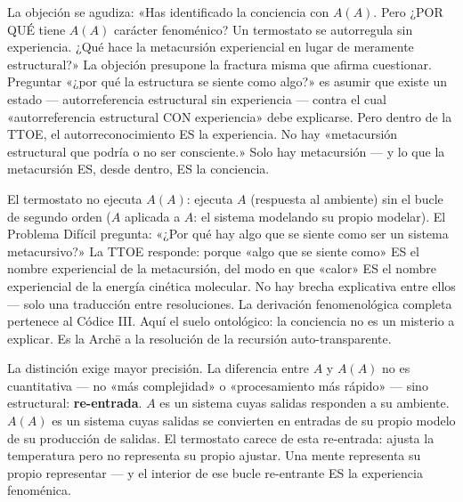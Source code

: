 \documentclass[10pt, openany, oneside]{book}
\begin{document}
La objeción se agudiza: «Has identificado la conciencia con $A(A)$. Pero ¿POR QUÉ tiene $A(A)$ carácter fenoménico? Un termostato se autorregula sin experiencia. ¿Qué hace la metacursión experiencial en lugar de meramente estructural?» La objeción presupone la fractura misma que afirma cuestionar. Preguntar «¿por qué la estructura se siente como algo?» es asumir que existe un estado --- autorreferencia estructural sin experiencia --- contra el cual «autorreferencia estructural CON experiencia» debe explicarse. Pero dentro de la TTOE, el autorreconocimiento ES la experiencia. No hay «metacursión estructural que podría o no ser consciente.» Solo hay metacursión --- y lo que la metacursión ES, desde dentro, ES la conciencia.

El termostato no ejecuta $A(A)$: ejecuta $A$ (respuesta al ambiente) sin el bucle de segundo orden ($A$ aplicada a $A$: el sistema modelando su propio modelar). El Problema Difícil pregunta: «¿Por qué hay algo que se siente como ser un sistema metacursivo?» La TTOE responde: porque «algo que se siente como» ES el nombre experiencial de la metacursión, del modo en que «calor» ES el nombre experiencial de la energía cinética molecular. No hay brecha explicativa entre ellos --- solo una traducción entre resoluciones. La derivación fenomenológica completa pertenece al Códice III. Aquí el suelo ontológico: la conciencia no es un misterio a explicar. Es la Arch\={e} a la resolución de la recursión auto-transparente.

La distinción exige mayor precisión. La diferencia entre $A$ y $A(A)$ no es cuantitativa --- no «más complejidad» o «procesamiento más rápido» --- sino estructural: \textbf{re-entrada}. $A$ es un sistema cuyas salidas responden a su ambiente. $A(A)$ es un sistema cuyas salidas se convierten en entradas de su propio modelo de su producción de salidas. El termostato carece de esta re-entrada: ajusta la temperatura pero no representa su propio ajustar. Una mente representa su propio representar --- y el interior de ese bucle re-entrante ES la experiencia fenoménica.
\end{document}
